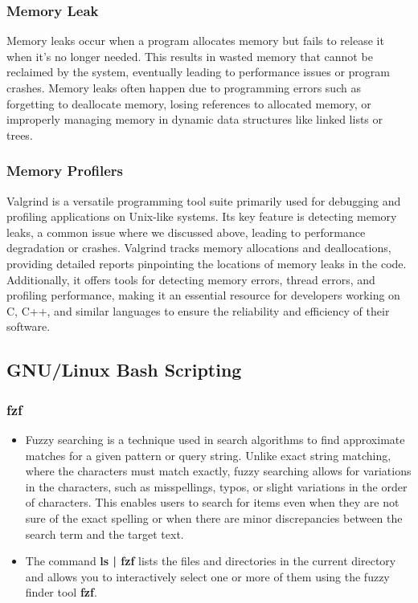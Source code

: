 \documentclass[titlepage]{article}
\begin{document}
\subsubsection{Memory Leak}

Memory leaks occur when a program allocates memory but fails to release it when it's no longer needed. This results in wasted memory that cannot be reclaimed by the system, eventually leading to performance issues or program crashes. Memory leaks often happen due to programming errors such as forgetting to deallocate memory, losing references to allocated memory, or improperly managing memory in dynamic data structures like linked lists or trees.

\subsubsection{Memory Profilers}
Valgrind is a versatile programming tool suite primarily used for debugging and profiling applications on Unix-like systems. Its key feature is detecting memory leaks, a common issue where we discussed above, leading to performance degradation or crashes. Valgrind tracks memory allocations and deallocations, providing detailed reports pinpointing the locations of memory leaks in the code. Additionally, it offers tools for detecting memory errors, thread errors, and profiling performance, making it an essential resource for developers working on C, C++, and similar languages to ensure the reliability and efficiency of their software.

\subsection{GNU/Linux Bash Scripting}
\subsubsection{fzf}
\begin{itemize}
\item Fuzzy searching is a technique used in search algorithms to find approximate matches for a given pattern or query string. Unlike exact string matching, where the characters must match exactly, fuzzy searching allows for variations in the characters, such as misspellings, typos, or slight variations in the order of characters. This enables users to search for items even when they are not sure of the exact spelling or when there are minor discrepancies between the search term and the target text.

\item  The command \textbf{ls | fzf } lists the files and directories in the current directory and allows you to interactively select one or more of them using the fuzzy finder tool \textbf {fzf}.
\end{itemize}
\end{document}
